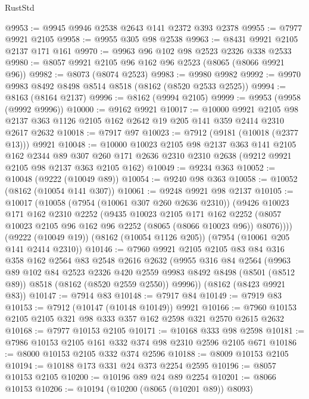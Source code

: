 \begin{lexlean}{RustStd}
\begin{coremodule}
@9953 := @9945 @9946 @2538 @2643 @141 @2372 @393 @2378
@9955 := @7977 @9921 @2105
@9958 := @9955 @305 @98 @2538
@9963 := @8431 @9921 @2105 @2137 @171 @161
@9970 := @9963 @96 @102 @98 @2523 @2326 @338 @2533
@9980 := @8057 @9921 @2105 @96 @162 @96 @2523 (@8065 (@8066 @9921 @96))
@9982 := @8073 (@8074 @2523)
@9983 := @9980 @9982
@9992 := @9970 @9983 @8492 @8498 @8514 @8518 (@8162 (@8520 @2533 @2525))
@9994 := @8163 (@8164 @2137)
@9996 := @8162 (@9994 @2105)
@9999 := @9953 (@9958 (@9992 @9996))
@10000 := @9162 @9921
@10017 := @10000
    @9921
    @2105
    @98
    @2137
    @363
    @1126
    @2105
    @162
    @2642
    @19
    @205
    @141
    @359
    @2414
    @2310
    @2617
    @2632
@10018 := @7917 @97
@10023 := @7912 (@9181 (@10018 (@2377 @13))) @9921
@10048 := @10000
    @10023
    @2105
    @98
    @2137
    @363
    @141
    @2105
    @162
    @2344
    @89
    @307
    @260
    @171
    @2636
    @2310
    @2310
    @2638
    (@9212 @9921 @2105 @98 @2137 @363 @2105 @162)
@10049 := @9234 @363
@10052 := @10048 (@9222 (@10049 @89))
@10054 := @9240 @98 @363
@10058 := @10052 (@8162 (@10054 @141 @307))
@10061 := @9248 @9921 @98 @2137
@10105 := @10017
    (@10058
      (@7954 (@10061 @307 @260 @2636 @2310))
      (@9426
        @10023
        @171
        @162
        @2310
        @2252
        (@9435
          @10023
          @2105
          @171
          @162
          @2252
          (@8057 @10023 @2105 @96 @162 @96 @2252 (@8065 (@8066 @10023 @96)) @8076))))
    (@9222 (@10049 @19))
    (@8162 (@10054 @1126 @205))
    (@7954 (@10061 @205 @141 @2414 @2310))
@10146 := @7960
    @9921
    @2105
    @2105
    @83
    @84
    @316
    @358
    @162
    @2564
    @83
    @2548
    @2616
    @2632
    (@9955
      @316
      @84
      @2564
      (@9963
        @89
        @102
        @84
        @2523
        @2326
        @420
        @2559
        @9983
        @8492
        @8498
        (@8501 (@8512 @89))
        @8518
        (@8162 (@8520 @2559 @2550))
        @9996))
    (@8162 (@8423 @9921 @83))
@10147 := @7914 @83
@10148 := @7917 @84
@10149 := @7919 @83
@10153 := @7912 (@10147 (@10148 @10149)) @9921
@10166 := @7960 @10153 @2105 @2105 @321 @98 @333 @357 @162 @2598 @321 @2570 @2615 @2632
@10168 := @7977 @10153 @2105
@10171 := @10168 @333 @98 @2598
@10181 := @7986 @10153 @2105 @161 @332 @374 @98 @2310 @2596 @2105 @671
@10186 := @8000 @10153 @2105 @332 @374 @2596
@10188 := @8009 @10153 @2105
@10194 := @10188 @173 @331 @24 @373 @2254 @2595
@10196 := @8057 @10153 @2105
@10200 := @10196 @89 @24 @89 @2254
@10201 := @8066 @10153
@10206 := @10194 (@10200 (@8065 (@10201 @89)) @8093)

\end{coremodule}
\end{lexlean}
